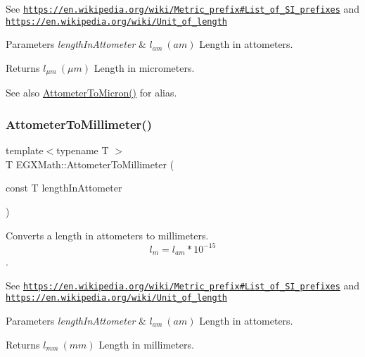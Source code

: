 See \href{https://en.wikipedia.org/wiki/Metric_prefix#List_of_SI_prefixes}{\tt https\+://en.\+wikipedia.\+org/wiki/\+Metric\+\_\+prefix\#\+List\+\_\+of\+\_\+\+S\+I\+\_\+prefixes} and \href{https://en.wikipedia.org/wiki/Unit_of_length}{\tt https\+://en.\+wikipedia.\+org/wiki/\+Unit\+\_\+of\+\_\+length} 
\begin{DoxyParams}{Parameters}
{\em length\+In\+Attometer} & $ l_{am}\ (am)$ Length in attometers. \\
\hline
\end{DoxyParams}
\begin{DoxyReturn}{Returns}
$ l_{\mu m}\ (\mu m)$ Length in micrometers. 
\end{DoxyReturn}
\begin{DoxySeeAlso}{See also}
\mbox{\hyperlink{group___e_g_x_math-_conversions-_length_conversions-_attometer-_non-_s_i_ga9aaf945221fbc8d469121e0fd0980b41}{Attometer\+To\+Micron()}} for alias. 
\end{DoxySeeAlso}
\mbox{\label{group___e_g_x_math-_conversions-_length_conversions-_attometer-_s_i_gaa1844671e09a5d485145eb7cc152ba19}} 
\subsubsection{\texorpdfstring{Attometer\+To\+Millimeter()}{AttometerToMillimeter()}}
{\footnotesize\ttfamily template$<$typename T $>$ \\
T E\+G\+X\+Math\+::\+Attometer\+To\+Millimeter (\begin{DoxyParamCaption}\item[{const T}]{length\+In\+Attometer }\end{DoxyParamCaption})}



Converts a length in attometers to millimeters. \[ l_{m}=l_{am} * 10^{-15} \]. 

See \href{https://en.wikipedia.org/wiki/Metric_prefix#List_of_SI_prefixes}{\tt https\+://en.\+wikipedia.\+org/wiki/\+Metric\+\_\+prefix\#\+List\+\_\+of\+\_\+\+S\+I\+\_\+prefixes} and \href{https://en.wikipedia.org/wiki/Unit_of_length}{\tt https\+://en.\+wikipedia.\+org/wiki/\+Unit\+\_\+of\+\_\+length} 
\begin{DoxyParams}{Parameters}
{\em length\+In\+Attometer} & $ l_{am}\ (am)$ Length in attometers. \\
\hline
\end{DoxyParams}
\begin{DoxyReturn}{Returns}
$ l_{mm}\ (mm)$ Length in millimeters. 
\end{DoxyReturn}
\mbox{\label{group___e_g_x_math-_conversions-_length_conversions-_attometer-_s_i_gacb010bf3c4fb120c4a43cf16c7d9c77f}} 
